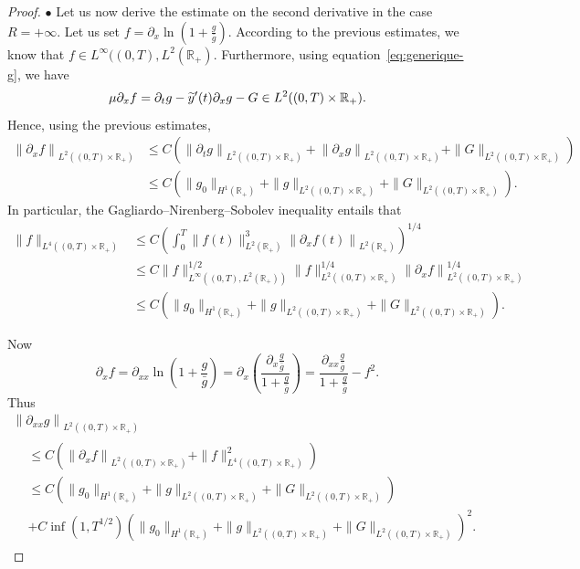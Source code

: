 \documentclass[AHL,Unicode,longabstracts,published]{cedram}
\newcommand{\R}{\mathbb{R}}
\newcommand{\p}{\partial}
\let\oldtilde\tilde
\renewcommand*{\tilde}[1]{\mathchoice{\widetilde{#1}}{\widetilde{#1}}{\oldtilde{#1}}{\oldtilde{#1}}}
\begin{document}
\begin{proof}
$\bullet$ Let us now derive the estimate on the second derivative in the case $R=+\infty$. Let us set $f=\p_x \ln (1+ \frac{g}{\bar g})$. According to the previous estimates, we know that $f\in L^\infty((0,T), L^2(\R_+)$. Furthermore, using equation~\eqref{eq:generique-g}, we have
\[
\mu \p_x f = \p_t g - \tilde y'(t) \p_x g - G\in L^2((0,T)\times \R_+).
\]
Hence, using the previous estimates,
\begin{align*}
\left\|\p_x f\right\|_{L^2\left((0,T)\times \R_+\right)}&\leq C \left(\left\|\p_t g\right\|_{L^2\left((0,T)\times \R_+\right)} + \left\|\p_x g\right\|_{L^2\left((0,T)\times \R_+\right)} + \|G\|_{L^2\left((0,T)\times \R_+\right)}\right) \\
&\leq C \left(\|g_0\|_{H^1(\R_+)} + \|g\|_{L^2\left((0,T)\times \R_+\right)} + \|G\|_{L^2\left((0,T)\times \R_+\right)}\right).
\end{align*}
In particular, the Gagliardo--Nirenberg--Sobolev inequality entails that
\begin{align*}
\| f\|_{L^4\left((0,T)\times\R_+\right)}&\leq C \left(\int_0^T \|f(t)\|_{L^2(\R_+)}^3 \left\|\p_x f(t)\right\|_{L^2(\R_+)}\right)^{1/4}\\
&\leq C\|f\|_{L^\infty\left((0,T), L^2(\R_+)\right)}^{1/2} \| f\|_{L^2\left((0,T)\times \R_+\right)}^{1/4}\left\| \p_x f\right\|_{L^2\left((0,T)\times \R_+\right)}^{1/4}\\
&\leq C \left(\|g_0\|_{H^1(\R_+)} + \|g\|_{L^2\left((0,T)\times \R_+\right)} + \|G\|_{L^2\left((0,T)\times \R_+\right)}\right).
\end{align*}


Now
\[
\p_x f=\p_{xx}\ln\left(1 + \frac{g}{\bar g}\right) = \p_x \left(\frac{\p_x \frac{g}{\bar g}}{1 + \frac{g}{\bar g}}\right)= \frac{\p_{xx} \frac{g}{\bar g}}{1 + \frac{g}{\bar g}} - f^2.
\]
Thus
\begin{multline*}
\left\|\p_{xx} g\right\|_{L^2\left((0,T)\times \R_+\right)}\\
\begin{aligned}
&\leq C \left(\left\|\p_x f\right\|_{L^2\left((0,T)\times \R_+\right)} + \|f\|_{L^4\left((0,T)\times \R_+\right)}^2\right)\\
&\leq C \left(\|g_0\|_{H^1(\R_+)} + \|g\|_{L^2\left((0,T)\times \R_+\right)} + \|G\|_{L^2\left((0,T)\times \R_+\right)}\right)\\
&+ C \inf\left(1, T^{1/2}\right)\left(\|g_0\|_{H^1(\R_+)} + \|g\|_{L^2\left((0,T)\times \R_+\right)} + \|G\|_{L^2\left((0,T)\times \R_+\right)}\right)^2.
\end{aligned}
\end{multline*}
\end{proof}
\end{document}
